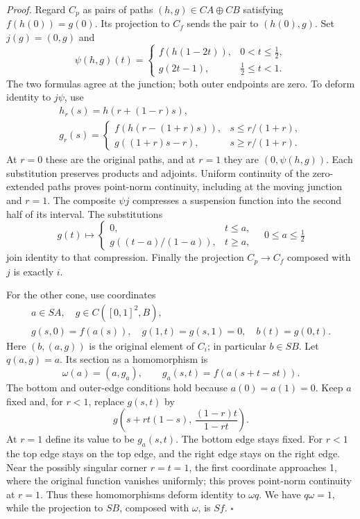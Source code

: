 \documentclass[
  11pt,
]{article}
\begin{document}
\emph{Proof.} Regard \(C_p\) as pairs of paths \((h,g)\in CA\oplus CB\)
satisfying \(f(h(0))=g(0)\). Its projection to \(C_f\) sends the pair to
\((h(0),g)\). Set \(j(g)=(0,g)\) and \[
\psi(h,g)(t)=
\begin{cases}
f(h(1-2t)),&0<t\le\tfrac12,\\
g(2t-1),&\tfrac12\le t<1.
\end{cases}
\tag{1.3}
\] The two formulas agree at the junction; both outer endpoints are
zero. To deform identity to \(j\psi\), use \[
\begin{gathered}
h_r(s)=h(r+(1-r)s),\\
g_r(s)=
\begin{cases}
f(h(r-(1+r)s)),&s\le r/(1+r),\\
g((1+r)s-r),&s\ge r/(1+r).
\end{cases}
\end{gathered}
\tag{1.4}
\] At \(r=0\) these are the original paths, and at \(r=1\) they are
\((0,\psi(h,g))\). Each substitution preserves products and adjoints.
Uniform continuity of the zero-extended paths proves point-norm
continuity, including at the moving junction and \(r=1\). The composite
\(\psi j\) compresses a suspension function into the second half of its
interval. The substitutions \[
g(t)\longmapsto
\begin{cases}
0,&t\le a,\\
g((t-a)/(1-a)),&t\ge a,
\end{cases}
\quad 0\le a\le\tfrac12
\tag{1.5}
\] join identity to that compression. Finally the projection
\(C_p\to C_f\) composed with \(j\) is exactly \(i\).

For the other cone, use coordinates \[
\begin{gathered}
a\in SA,\quad g\in C([0,1]^2,B),\\
g(s,0)=f(a(s)),\quad
g(1,t)=g(s,1)=0,\quad b(t)=g(0,t).
\end{gathered}
\tag{1.6}
\] Here \((b,(a,g))\) is the original element of \(C_i\); in particular
\(b\in SB\). Let \(q(a,g)=a\). Its section as a homomorphism is \[
\omega(a)=(a,g_a),\qquad
g_a(s,t)=f(a(s+t-st)).
\tag{1.7}
\] The bottom and outer-edge conditions hold because \(a(0)=a(1)=0\).
Keep \(a\) fixed and, for \(r<1\), replace \(g(s,t)\) by \[
g\left(s+rt(1-s),\,\frac{(1-r)t}{1-rt}\right).
\tag{1.8}
\] At \(r=1\) define its value to be \(g_a(s,t)\). The bottom edge stays
fixed. For \(r<1\) the top edge stays on the top edge, and the right
edge stays on the right edge. Near the possibly singular corner
\(r=t=1\), the first coordinate approaches 1, where the original
function vanishes uniformly; this proves point-norm continuity at
\(r=1\). Thus these homomorphisms deform identity to \(\omega q\). We
have \(q\omega=1\), while the projection to \(SB\), composed with
\(\omega\), is \(Sf\). \(\square\)
\end{document}
